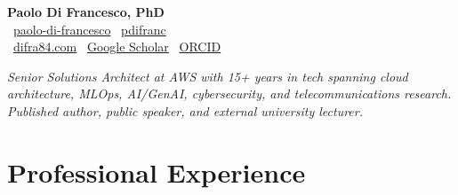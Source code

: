 \documentclass[11pt,a4paper]{article}
\begin{document}
\begin{center}
{\LARGE\bfseries Paolo Di Francesco, PhD}\\[3pt]
\faLinkedin\ \href{https://www.linkedin.com/in/paolo-di-francesco}{paolo-di-francesco} \quad
\faGithub\ \href{https://github.com/pdifranc}{pdifranc}\\[2pt]
\faGlobe\ \href{https://difra84.com}{difra84.com} \quad
\faGraduationCap\ \href{https://scholar.google.at/citations?user=ZpEaqsQAAAAJ}{Google Scholar} \quad
\faOrcid\ \href{https://orcid.org/0000-0002-1136-741X}{ORCID}
\end{center}

\vspace{-4pt}
\begin{center}
\textit{Senior Solutions Architect at AWS with 15+ years in tech spanning cloud architecture, MLOps, AI/GenAI, cybersecurity, and telecommunications research. Published author, public speaker, and external university lecturer.}
\end{center}

\section{Professional Experience}
\end{document}
